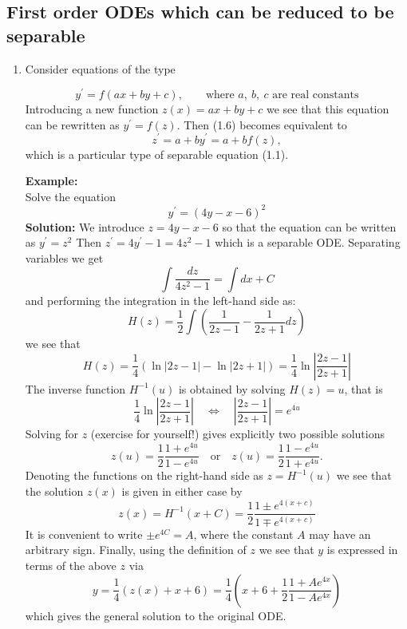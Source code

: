 \documentclass[11pt,a4paper,twoside]{article}
\begin{document}
	\subsection{First order ODEs which can be reduced to be separable}
	\begin{enumerate}
			\item Consider equations of the type
			
			\begin{equation}
					y^\prime = f(ax + by + c), \qquad \text{where $a,\ b,\ c$ are real constants}
			\end{equation}
			Introducing a new function $z(x) = ax + by + c$ we see that this equation can be rewritten as $y^\prime = f(z)$. Then (1.6) becomes equivalent to
			\begin{equation}
					z^\prime = a + by^\prime = a + bf(z),
			\end{equation}
			which is a particular type of separable equation (1.1).\par
			\textbf{Example:}\\
			Solve the equation
			$$
			y^\prime = (4y − x − 6)^2
			$$
			\textbf{Solution:}
			We introduce $z = 4y − x − 6$ so that the equation can be written as $y^\prime = z^2$ Then $z^\prime = 4y^\prime − 1 = 4z^2 − 1$ which is a separable ODE. Separating variables we get
			$$
			\int \frac{dz}{4z^2-1} = \int dx + C
			$$
			and performing the integration in the left-hand side as:
			$$
			H(z) = \frac{1}{2}\int \left(\frac{1}{2z-1}-\frac{1}{2z+1}dz\right)
			$$
			we see that
			$$
			H(z)
			= \frac{1}{4}(\ln \left\lvert 2z − 1 \right\rvert - \ln \left\lvert 2z + 1 \right\rvert)
			= \frac{1}{4} \ln \left\lvert \frac{2z − 1}{2z + 1}\right\rvert 
			$$
			The inverse function $H^{−1}(u)$ is obtained by solving $H(z) = u$, that is
			$$
			\frac{1}{4} \ln \left\lvert \frac{2z − 1}{2z + 1}\right\rvert
			\quad
			\Leftrightarrow 
			\quad
			\left\lvert \frac{2z − 1}{2z + 1}\right\rvert
			= e^{4u}
			$$
			Solving for $z$ (exercise for yourself!) gives explicitly two possible solutions
			$$
			z(u) = \frac{1}{2}\frac{1+e^{4u}}{1-e^{4u}}
			\quad
			\text{or}
			\quad
			z(u) = \frac{1}{2}\frac{1-e^{4u}}{1+e^{4u}}.
			$$
			Denoting the functions on the right-hand side as $z = H^{−1}(u)$ we see that the solution $z(x)$ is given in either case by
			$$
			z(x)
			= H^{-1}(x+C)
			= \frac{1}{2}\frac{1\pm e^{4(x+c)}}{1\mp e^{4(x+c)}}
			$$
			It is convenient to write $\pm e^{4C} = A$, where the constant $A$ may have an arbitrary sign. Finally, using the definition of $z$ we see that $y$ is expressed in terms of the above $z$ via
			$$
			y
			= \frac{1}{4}(z(x) + x + 6)
			= \frac{1}{4}\left(x + 6 + \frac{1}{2}\frac{1 + Ae^{4x}}{1 - Ae^{4x}}\right)
			$$
			which gives the general solution to the original ODE.
	\end{enumerate}
\end{document}
